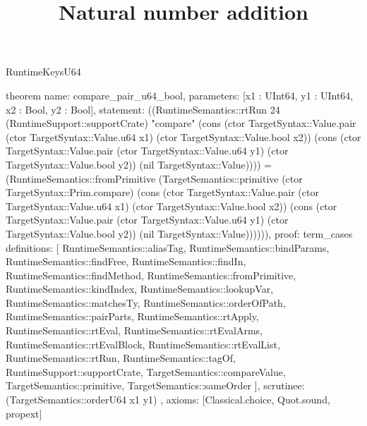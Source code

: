 \begin{lexlean}{RuntimeKeysU64}
\title{Natural number addition}
\begin{semanticmodule}
theorem{
  name: compare_pair_u64_bool,
  parameters: [x1 : UInt64, y1 : UInt64, x2 : Bool, y2 : Bool],
  statement: ((RuntimeSemantics::rtRun 24 (RuntimeSupport::supportCrate) "compare" (cons (ctor TargetSyntax::Value.pair (ctor TargetSyntax::Value.u64 x1) (ctor TargetSyntax::Value.bool x2)) (cons (ctor TargetSyntax::Value.pair (ctor TargetSyntax::Value.u64 y1) (ctor TargetSyntax::Value.bool y2)) (nil TargetSyntax::Value)))) = (RuntimeSemantics::fromPrimitive (TargetSemantics::primitive (ctor TargetSyntax::Prim.compare) (cons (ctor TargetSyntax::Value.pair (ctor TargetSyntax::Value.u64 x1) (ctor TargetSyntax::Value.bool x2)) (cons (ctor TargetSyntax::Value.pair (ctor TargetSyntax::Value.u64 y1) (ctor TargetSyntax::Value.bool y2)) (nil TargetSyntax::Value)))))),
  proof: term_cases{
    definitions: [
      RuntimeSemantics::aliasTag,
      RuntimeSemantics::bindParams,
      RuntimeSemantics::findFree,
      RuntimeSemantics::findIn,
      RuntimeSemantics::findMethod,
      RuntimeSemantics::fromPrimitive,
      RuntimeSemantics::kindIndex,
      RuntimeSemantics::lookupVar,
      RuntimeSemantics::matchesTy,
      RuntimeSemantics::orderOfPath,
      RuntimeSemantics::pairParts,
      RuntimeSemantics::rtApply,
      RuntimeSemantics::rtEval,
      RuntimeSemantics::rtEvalArms,
      RuntimeSemantics::rtEvalBlock,
      RuntimeSemantics::rtEvalList,
      RuntimeSemantics::rtRun,
      RuntimeSemantics::tagOf,
      RuntimeSupport::supportCrate,
      TargetSemantics::compareValue,
      TargetSemantics::primitive,
      TargetSemantics::sameOrder
    ],
    scrutinee: (TargetSemantics::orderU64 x1 y1)
  },
  axioms: [Classical.choice, Quot.sound, propext]
}


\end{semanticmodule}
\end{lexlean}
